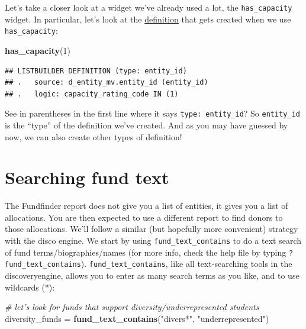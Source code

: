 \documentclass[]{book}
\newenvironment{Shaded}{\begin{snugshade}}{\end{snugshade}}
\newcommand{\CommentTok}[1]{\textcolor[rgb]{0.56,0.35,0.01}{\textit{#1}}}
\newcommand{\DecValTok}[1]{\textcolor[rgb]{0.00,0.00,0.81}{#1}}
\newcommand{\KeywordTok}[1]{\textcolor[rgb]{0.13,0.29,0.53}{\textbf{#1}}}
\newcommand{\NormalTok}[1]{#1}
\newcommand{\StringTok}[1]{\textcolor[rgb]{0.31,0.60,0.02}{#1}}
\begin{document}
Let's take a closer look at a widget we've already used a lot, the \texttt{has\_capacity} widget. In particular, let's look at the \protect\hyperlink{intro-example-create-def}{definition} that gets created when we use \texttt{has\_capacity}:

\begin{Shaded}
\begin{Highlighting}[]
\KeywordTok{has_capacity}\NormalTok{(}\DecValTok{1}\NormalTok{)}
\end{Highlighting}
\end{Shaded}

\begin{verbatim}
## LISTBUILDER DEFINITION (type: entity_id)
## .   source: d_entity_mv.entity_id (entity_id)
## .   logic: capacity_rating_code IN (1)
\end{verbatim}

See in parentheses in the first line where it says \texttt{type:\ entity\_id}? So \texttt{entity\_id} is the ``type'' of the definition we've created. And as you may have guessed by now, we can also create other types of definition!

\hypertarget{searching-fund-text}{%
\section{Searching fund text}\label{searching-fund-text}}

The Fundfinder report does not give you a list of entities, it gives you a list of allocations. You are then expected to use a different report to find donors to those allocations. We'll follow a similar (but hopefully more convenient) strategy with the disco engine. We start by using \texttt{fund\_text\_contains} to do a text search of fund terms/biographies/names (for more info, check the help file by typing \texttt{?fund\_text\_contains}). \texttt{fund\_text\_contains}, like all text-searching tools in the discoveryengine, allows you to enter as many search terms as you like, and to use wildcards (*):

\begin{Shaded}
\begin{Highlighting}[]
\CommentTok{# let's look for funds that support diversity/underrepresented students}
\NormalTok{diversity_funds =}\StringTok{ }\KeywordTok{fund_text_contains}\NormalTok{(}\StringTok{"divers*"}\NormalTok{, }\StringTok{"underrepresented"}\NormalTok{)}
\end{Highlighting}
\end{Shaded}
\end{document}
